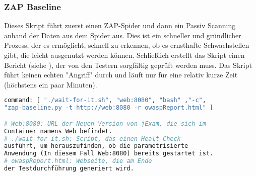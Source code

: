 \subsubsection{ZAP Baseline}

Dieses Skript führt zuerst einen ZAP-Spider und dann ein Passiv Scanning
anhand der Daten aus dem Spider aus. Dies ist ein schneller und gründlicher
Prozess, der es ermöglicht, schnell zu erkennen, ob es ernsthafte
Schwachstellen gibt, die leicht ausgenutzt werden können. Schließlich erstellt
das Skript einen Bericht (siehe ), der von den Testern sorgfältig geprüft werden muss.
Das Skript führt keinen echten "Angriff" durch und läuft nur für eine
relativ kurze Zeit (höchstens ein paar Minuten).


\begin{lstlisting}[language=Dockerfile,label={lst:baseline},caption={ZAP Baseline Ausführungsbefehl}]
command: [ "./wait-for-it.sh", "web:8080", "bash" ,"-c",
"zap-baseline.py -t http://web:8080 -r owaspReport.html" ]

# Web:8080: URL der Neuen Version von jExam, die sich im
Container namens Web befindet.
# ./wait-for-it.sh: Script, das einen Healt-Check
ausführt, um herauszufinden, ob die parametrisierte
Anwendung (In diesem Fall Web:8080) bereits gestartet ist.
# owaspReport.html: Webseite, die am Ende
der Testdurchführung generiert wird.
\end{lstlisting}
